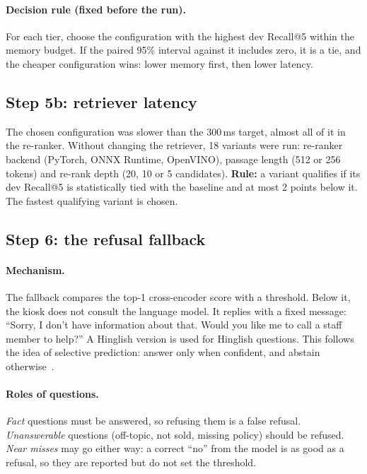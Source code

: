 \documentclass[11pt,a4paper]{article}
\begin{document}
\paragraph{Decision rule (fixed before the run).} For each tier, choose the configuration with the highest dev
Recall@5 within the memory budget. If the paired 95\% interval against it includes zero, it is a tie, and the cheaper
configuration wins: lower memory first, then lower latency.

\subsection{Step 5b: retriever latency}\label{sec:5bmethod}
The chosen configuration was slower than the 300\,ms target, almost all of it in the re-ranker. Without changing the
retriever, 18 variants were run: re-ranker backend (PyTorch, ONNX Runtime, OpenVINO), passage length (512 or 256
tokens) and re-rank depth (20, 10 or 5 candidates).
\textbf{Rule:} a variant qualifies if its dev Recall@5 is statistically tied with the baseline and at most 2 points
below it. The fastest qualifying variant is chosen.

\subsection{Step 6: the refusal fallback}\label{sec:fallbackmethod}
\paragraph{Mechanism.} The fallback compares the top-1 cross-encoder score with a threshold. Below it, the kiosk does
not consult the language model. It replies with a fixed message: ``Sorry, I don't have information about that. Would
you like me to call a staff member to help?'' A Hinglish version is used for Hinglish questions. This follows the idea
of selective prediction: answer only when confident, and abstain otherwise~\cite{selective}.

\paragraph{Roles of questions.} \emph{Fact} questions must be answered, so refusing them is a false refusal.
\emph{Unanswerable} questions (off-topic, not sold, missing policy) should be refused. \emph{Near misses} may go either
way: a correct ``no'' from the model is as good as a refusal, so they are reported but do not set the threshold.
\end{document}

